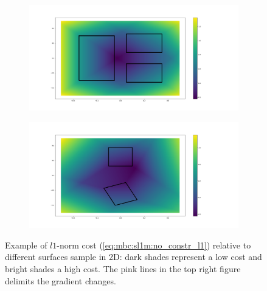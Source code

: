 \begin{figure}[ht]
\begin{subfigure}[t]{0.48\linewidth}
    \end{subfigure}
    \begin{subfigure}[t]{0.48\linewidth}
    \includegraphics[trim={5cm 2cm 12cm 2cm},clip,width=\textwidth]{Figures/Chapter_MIP_SL1M/l1_no_cst/grad_three_0_1_2.png}
    \end{subfigure}
    \begin{subfigure}[t]{0.48\linewidth}
    \includegraphics[trim={5cm 2cm 12cm 2cm},clip,width=\textwidth]{Figures/Chapter_MIP_SL1M/l1_no_cst/grad_simple_rotate.png}
    \end{subfigure}
    \caption{Example of $l1$-norm cost (\ref{eq:mbc:sl1m:no_constr_l1}) relative to different surfaces sample in 2D: dark shades represent a low cost and bright shades a high cost. The pink lines in the top right figure delimits the gradient changes.}
    \label{fig:sl1m:no_constraint}
\end{figure}
